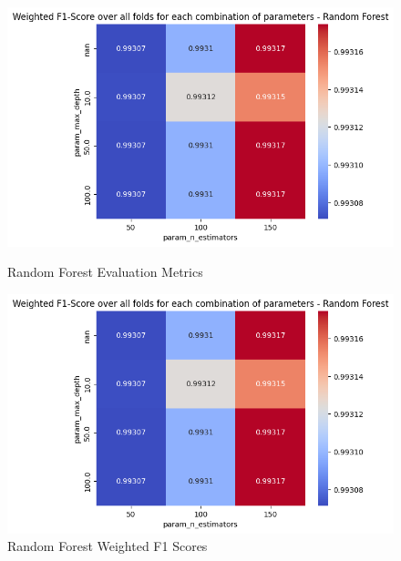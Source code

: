\begin{figure}[H]
            \begin{minipage}{\textwidth}
                \begin{minipage}[t]{0.48\textwidth}
                    \centering
                    \includegraphics[width=\textwidth]{../figures/plots/section2/weighted_f1_score_for_each_combination_of_parameters_random_forest.png}
                    \caption{Random Forest Evaluation Metrics}
                    \label{fig:}
                \end{minipage}%
                \hfill%
                \begin{minipage}[t]{0.48\textwidth}
                    \centering
                    \includegraphics[width=\textwidth]{../figures/plots/section2/weighted_f1_score_for_each_combination_of_parameters_random_forest.png}
                    \caption{Random Forest Weighted F1 Scores}
                    \label{fig:}
                \end{minipage}
            \end{minipage}
            

\end{figure}
